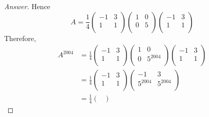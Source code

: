 \documentclass[../psets.tex]{subfiles}
\begin{document}
\begin{enumerate}[label={\textbf{2.\arabic*.}}]
\begin{proof}[Answer]
        Hence
        \begin{equation*}
            A = \frac{1}{4}
            \begin{pmatrix}
                -1 & 3\\
                1 & 1\\
            \end{pmatrix}
            \begin{pmatrix}
                1 & 0\\
                0 & 5\\
            \end{pmatrix}
            \begin{pmatrix}
                -1 & 3\\
                1 & 1\\
            \end{pmatrix}
        \end{equation*}
        Therefore,
        \begin{align*}
            A^{2004} &= \frac{1}{4}
            \begin{pmatrix}
                -1 & 3\\
                1 & 1\\
            \end{pmatrix}
            \begin{pmatrix}
                1 & 0\\
                0 & 5^{2004}\\
            \end{pmatrix}
            \begin{pmatrix}
                -1 & 3\\
                1 & 1\\
            \end{pmatrix}\\
            &= \frac{1}{4}
            \begin{pmatrix}
                -1 & 3\\
                1 & 1\\
            \end{pmatrix}
            \begin{pmatrix}
                -1 & 3\\
                5^{2004} & 5^{2004}\\
            \end{pmatrix}\\
            &= \frac{1}{4}
            \begin{pmatrix}

\end{pmatrix}
\end{align*}
\end{proof}
\end{enumerate}
\end{document}
